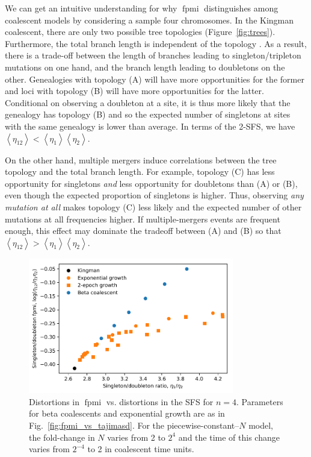 \documentclass[11pt, letterpaper]{article}   	%
\newcommand{\fig}[1]{Fig.~\ref{#1}}
\newcommand{\Fig}[1]{Figure~\ref{#1}}
\newcommand{\E}[1]{\left< #1 \right>}
\DeclareMathOperator{\fpmi}{fpmi}
\begin{document}
We can get an intuitive understanding for why $\fpmi$ distinguishes among coalescent models by considering a sample four chromosomes.
In the Kingman coalescent, there are only two possible tree topologies (\Fig{fig:trees}).
Furthermore, the total branch length is independent of the topology \cite{Wakeley2009}.
As a result, there is a trade-off between the length of branches leading to singleton/tripleton mutations on one hand, and the branch length leading to doubletons on the other.
Genealogies with topology (A) will have more opportunities for the former and loci with topology (B) will have more opportunities for the latter.
Conditional on observing a doubleton at a site, it is thus more likely that the genealogy has topology (B) and so the expected number of singletons at sites with the same genealogy is lower than average.
In terms of the 2-SFS, we have $\E{\eta_{12}} < \E{\eta_{1}} \E{\eta_{2}}$.

On the other hand, multiple mergers induce correlations between the tree topology and the total branch length.
For example, topology (C) has less opportunity for singletons \emph{and} less opportunity for doubletons than (A) or (B), even though the expected proportion of singletons is higher.
Thus, observing \emph{any mutation at all} makes topology (C) less likely and the expected number of other mutations at all frequencies higher.
If multiple-mergers events are frequent enough, this effect may dominate the tradeoff between (A) and (B) so that $\E{\eta_{12}} > \E{\eta_{1}} \E{\eta_{2}}$.

\begin{figure}
\centering
\includegraphics[width=0.8\textwidth]{figures/singleton-doubleton.pdf}
\caption{Distortions in $\fpmi$ vs. distortions in the SFS for $n=4$. Parameters for beta coalescents and exponential growth are as in \fig{fig:fpmi_vs_tajimasd}. For the piecewise-constant--$N$ model, the fold-change in $N$ varies from 2 to $2^4$ and the time of this change varies from $2^{-4}$ to 2 in coalescent time units. \label{fig:sdpmi_vs_sdratio}}
\end{figure}
\end{document}
